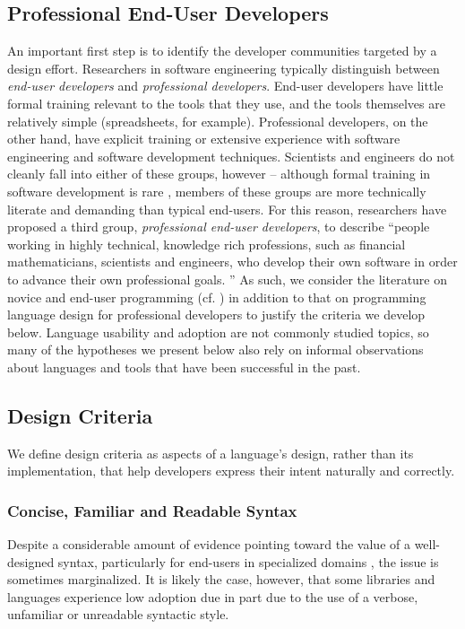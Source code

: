 \documentclass{llncs}
\begin{document}
\subsection{Professional End-User Developers}
An important first step is to identify the developer communities targeted by a design effort. Researchers in software engineering typically distinguish between {\it end-user developers} and {\it professional developers}. End-user developers have little formal training relevant to the tools that they use, and the tools themselves are relatively simple (spreadsheets, for example). Professional developers, on the other hand, have explicit training or extensive experience with software engineering and software development techniques. Scientists and engineers do not cleanly fall into either of these groups, however -- although formal training in software development is rare \cite{oai:open.ac.uk.OAI2:17673}, members of these groups are more technically literate and demanding than typical end-users. For this reason, researchers have proposed a third group, {\it professional end-user developers}, to describe ``people working in highly technical, knowledge rich professions, such as financial mathematicians, scientists and engineers, who develop their own software in order to advance their own professional goals. \cite{segal2007some}'' 
As such, we consider the literature on novice and end-user programming (cf. \cite{pane1996usability}) in addition to that on programming language design for professional developers to justify the criteria we develop below. Language usability and adoption are not commonly studied topics, so many of the hypotheses we present below also rely on informal observations about languages and tools that have been successful in the past.

\subsection{Design Criteria}
We define design criteria as aspects of a language's design, rather than its implementation, that help developers express their intent naturally and correctly.
 
\subsubsection{Concise, Familiar and Readable Syntax}\label{syntax}
Despite a considerable amount of evidence pointing toward the value of a well-designed syntax, particularly for end-users in specialized domains \cite{pane1996usability}, the issue is sometimes marginalized. It is likely the case, however, that some libraries and languages experience low adoption due in  part due to the use of a verbose, unfamiliar or unreadable syntactic style.
\end{document}
